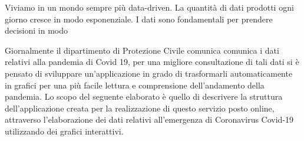 

Viviamo in un mondo sempre più data-driven. La quantità di dati prodotti ogni giorno cresce in modo esponenziale.
I dati sono fondamentali per prendere decisioni in modo 



Giornalmente il dipartimento di Protezione Civile comunica comunica i dati relativi alla pandemia di Covid 19, per una migliore consultazione di tali dati si è pensato di sviluppare un’applicazione in grado di trasformarli automaticamente in grafici per una più facile lettura e comprensione dell’andamento della pandemia.
Lo scopo del seguente elaborato è quello di descrivere la struttura dell'applicazione creata per la realizzazione di questo servizio posto online, attraverso l’elaborazione dei dati relativi all’emergenza di Coronavirus Covid-19 utilizzando dei grafici interattivi.
